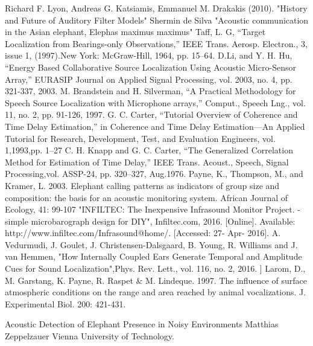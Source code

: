 \documentclass[12pt]{article}
\numberwithin{figure}{section}
\numberwithin{table}{section}
\begin{document}
\begin{thebibliography}{1}
 Richard F. Lyon, Andreas G. Katsiamis, Emmanuel M. Drakakis (2010). "History and Future of Auditory Filter Models"
 Shermin de Silva "Acoustic communication in the Asian elephant,
Elephas maximus maximus"
 Taff, L. G, “Target Localization from Bearings-only Observations,”
IEEE Trans. Aerosp. Electron., 3, issue 1, (1997).New York: McGraw-Hill, 1964, pp. 15–64.
D.Li, and Y. H. Hu, “Energy Based Collaborative Source Localization
Using Acoustic Micro-Sensor Array,” EURASIP Journal on Applied
Signal Processing, vol. 2003, no. 4, pp. 321-337, 2003.
M. Brandstein and H. Silverman, “A Practical Methodology for Speech
Source Localization with Microphone arrays,” Comput., Speech Lng.,
vol. 11, no. 2, pp. 91-126, 1997.
 G. C. Carter, “Tutorial Overview of Coherence and Time Delay Estimation,”
in Coherence and Time Delay Estimation—An Applied Tutorial for Research, Development, Test, and Evaluation Engineers, vol. 1,1993,pp. 1–27
C. H. Knapp and G. C. Carter, “The Generalized Correlation Method for Estimation of Time Delay,” IEEE Trans. Acoust., Speech, Signal Processing,vol. ASSP-24, pp. 320–327, Aug.1976.
 Payne, K., Thompson, M., and Kramer, L. 2003. Elephant calling patterns as indicators of group size and composition: the basis for an acoustic monitoring system. African Journal of Ecology, 41: 99-107
 "INFILTEC: The Inexpensive Infrasound Monitor Project. - simple microbarograph design for DIY", Infiltec.com, 2016. [Online]. Available: http://www.infiltec.com/Infrasound@home/. [Accessed: 27- Apr- 2016].
 A. Vedurmudi, J. Goulet, J. Christensen-Dalsgaard, B. Young, R. Williams and J. van Hemmen, "How Internally Coupled Ears Generate Temporal and Amplitude Cues for Sound Localization",Phys. Rev. Lett., vol. 116, no. 2, 2016.
 ] Larom, D., M. Garstang, K. Payne, R. Raspet \& M. Lindeque. 1997. The influence of surface atmospheric conditions on the range and area reached by animal vocalizations. J. Experimental Biol. 200: 421-431.

 Acoustic Detection of Elephant Presence in Noisy Environments Matthias Zeppelzauer Vienna University of Technology.




\end{thebibliography}
\end{document}
